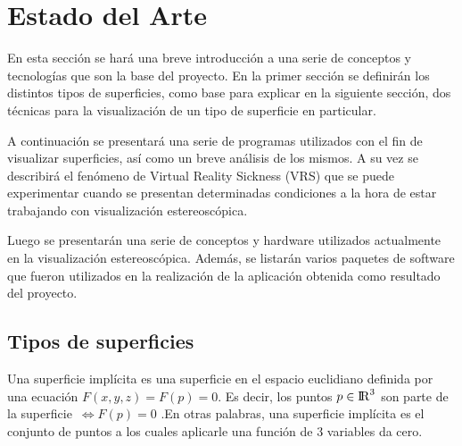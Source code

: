 \documentclass[12pt]{article}
\begin{document}
\section{Estado del Arte}
En esta sección se hará una breve introducción a una serie de conceptos y tecnologías que son la base del proyecto. En la primer sección se definirán los distintos tipos de superficies, como base para explicar en la siguiente sección, dos técnicas para la visualización de un tipo de superficie en particular. 

A continuación se presentará una serie de programas utilizados con el fin de visualizar superficies, así como un breve análisis de los mismos. A su vez se describirá el fenómeno de Virtual Reality Sickness (VRS) que se puede experimentar cuando se presentan determinadas condiciones a la hora de estar trabajando con visualización estereoscópica.

Luego se presentarán una serie de conceptos y hardware utilizados actualmente en la visualización estereoscópica. Además, se listarán varios paquetes de software que fueron utilizados en la realización de la aplicación obtenida como resultado del proyecto.
\subsection{Tipos de superficies}
Una superficie implícita es una superficie en el espacio euclidiano definida por una ecuación $F (x, y, z) =  F(p) = 0$.  Es decir, los  puntos $ p \in {\rm I\!R} ^3$ son parte de la superficie~$ \iff F(p) = 0$ \cite{realtimerendering}.En otras palabras, una superficie implícita es el conjunto de puntos a los cuales aplicarle una función de 3 variables da cero. 
\end{document}
